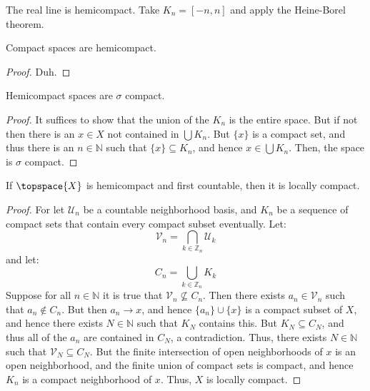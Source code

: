         \begin{example}
            The real line is hemicompact. Take $K_{n}=[\minus{n},n]$ and apply
            the Heine-Borel theorem.
        \end{example}
        \begin{theorem}
            Compact spaces are hemicompact.
        \end{theorem}
        \begin{proof}
            Duh.
        \end{proof}
        \begin{theorem}
            Hemicompact spaces are $\sigma$ compact.
        \end{theorem}
        \begin{proof}
            It suffices to show that the union of the $K_{n}$ is the entire
            space. But if not then there is an $x\in{X}$ not contained in
            $\bigcup{K}_{n}$. But $\{x\}$ is a compact set, and thus there is an
            $n\in\mathbb{N}$ such that $\{x\}\subseteq{K}_{n}$, and hence
            $x\in\bigcup{K}_{n}$. Then, the space is $\sigma$ compact.
        \end{proof}
        \begin{theorem}
            If $\topspace{X}$ is hemicompact and first countable, then it is
            locally compact.
        \end{theorem}
        \begin{proof}
            For let $\mathcal{U}_{n}$ be a countable neighborhood basis, and
            $K_{n}$ be a sequence of compact sets that contain every compact
            subset eventually. Let:
            \begin{equation}
                \mathcal{V}_{n}=\bigcap_{k\in\mathbb{Z}_{n}}\mathcal{U}_{k}
            \end{equation}
            and let:
            \begin{equation}
                C_{n}=\bigcup_{k\in\mathbb{Z}_{n}}K_{k}
            \end{equation}
            Suppose for all $n\in\mathbb{N}$ it is true that
            $\mathcal{V}_{n}\nsubseteq{C}_{n}$. Then there exists
            $a_{n}\in\mathcal{V}_{n}$ such that $a_{n}\notin{C}_{n}$. But then
            $a_{n}\rightarrow{x}$, and hence $\{a_{n}\}\cup\{x\}$ is a compact
            subset of $X$, and hence there exists $N\in\mathbb{N}$ such that
            $K_{N}$ contains this. But $K_{N}\subseteq{C}_{N}$, and thus
            all of the $a_{n}$ are contained in $C_{N}$, a contradiction. Thus,
            there exists $N\in\mathbb{N}$ such that
            $\mathcal{V}_{N}\subseteq{C}_{N}$. But the finite intersection of
            open neighborhoods of $x$ is an open neighborhood, and the finite
            union of compact sets is compact, and hence $K_{n}$ is a compact
            neighborhood of $x$. Thus, $X$ is locally compact.
        \end{proof}
